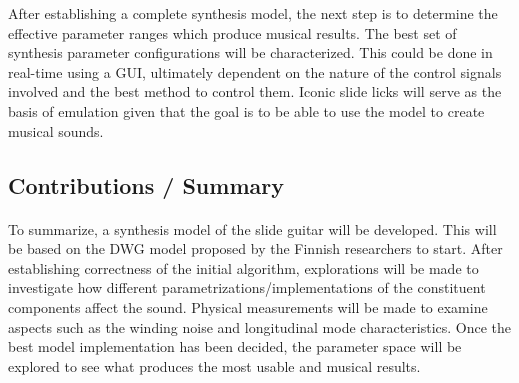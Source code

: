 \documentclass[12pt]{article}
\begin{document}
After establishing a complete synthesis model, the next step is to determine the effective parameter ranges which produce musical results. The best set of synthesis parameter configurations will be characterized. This could be done in real-time using a GUI, ultimately dependent on the nature of the control signals involved and the best method to control them. Iconic slide licks will serve as the basis of emulation given that the goal is to be able to use the model to create musical sounds.

\subsection*{Contributions / Summary}
\paragraph{}
To summarize, a synthesis model of the slide guitar will be developed. This will be based on the DWG model proposed by the Finnish researchers to start. After establishing correctness of the initial algorithm, explorations will be made to investigate how different parametrizations/implementations of the constituent components affect the sound. Physical measurements will be made to examine aspects such as the winding noise and longitudinal mode characteristics. Once the best model implementation has been decided, the parameter space will be explored to see what produces the most usable and musical results.

\clearpage


\end{document}
